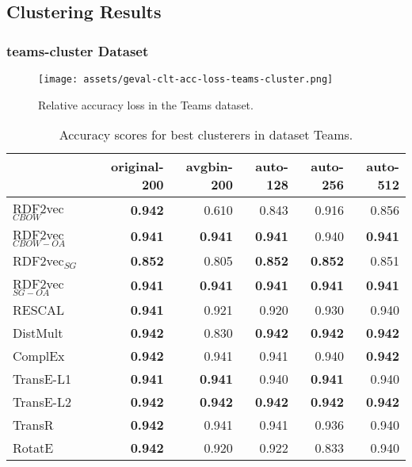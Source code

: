 \documentclass[11pt,titlepage,oneside,openany]{book}
\begin{document}
\newpage

\subsection{Clustering Results}
\label{subsec:geval-results-clt-dataset}

\subsubsection{teams-cluster Dataset}
\label{subsubsec:geval-results-clt-teams-cluster}


\begin{figure}[H]
    \centering
    \texttt{[image: assets/geval-clt-acc-loss-teams-cluster.png]}
    \vspace*{-3mm}
    \caption{Relative accuracy loss in the Teams dataset.}
    \label{fig:geval-clt-acc-loss-teams-cluster}
\end{figure}


\begin{table}[H]
\centering
\begin{tabular}{lrrrrr}
\toprule
{} &  original-200 &  avgbin-200 &  auto-128 &  auto-256 &  auto-512 \\
\midrule
RDF2vec$_{CBOW}$     &	\textbf{0.942} &       0.610  &     0.843  &     0.916  &     0.856  \\
RDF2vec$_{CBOW-OA}$  &	\textbf{0.941} &	\textbf{0.941} &	\textbf{0.941} &     0.940  &	\textbf{0.941} \\
RDF2vec$_{SG}$       &	\textbf{0.852} &       0.805  &	\textbf{0.852} &	\textbf{0.852} &     0.851  \\
RDF2vec$_{SG-OA}$    &	\textbf{0.941} &	\textbf{0.941} &	\textbf{0.941} &	\textbf{0.941} &	\textbf{0.941} \\
RESCAL               &	\textbf{0.941} &       0.921  &     0.920  &     0.930  &     0.940  \\
DistMult             &	\textbf{0.942} &       0.830  &	\textbf{0.942} &	\textbf{0.942} &	\textbf{0.942} \\
ComplEx              &	\textbf{0.942} &       0.941  &     0.941  &     0.940  &	\textbf{0.942} \\
TransE-L1            &	\textbf{0.941} &	\textbf{0.941} &     0.940  &	\textbf{0.941} &     0.940  \\
TransE-L2            &	\textbf{0.942} &	\textbf{0.942} &	\textbf{0.942} &	\textbf{0.942} &	\textbf{0.942} \\
TransR               &	\textbf{0.942} &       0.941  &     0.941  &     0.936  &     0.940  \\
RotatE               &	\textbf{0.942} &       0.920  &     0.922  &     0.833  &     0.940  \\
\bottomrule
\end{tabular}
\caption{Accuracy scores for best clusterers in dataset Teams.}
\label{tab:geval-clt-acc-teams-cluster}
\end{table}
\end{document}
